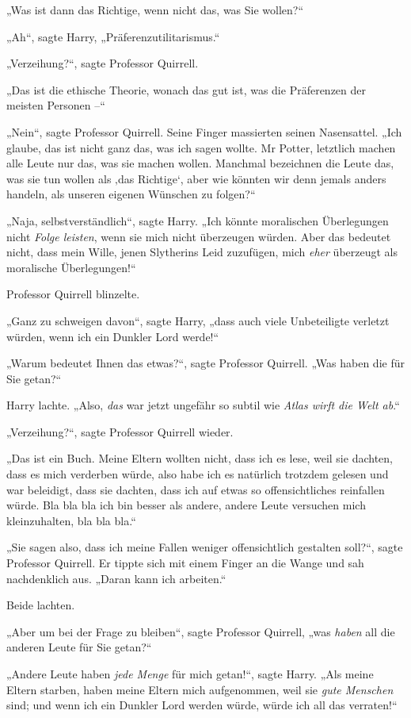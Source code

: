 {„Was ist dann das Richtige, wenn nicht das, was Sie wollen?“

„Ah“, sagte Harry, „Präferenzutilitarismus.“

„Verzeihung?“, sagte Professor Quirrell.

„Das ist die ethische Theorie, wonach das gut ist, was die Präferenzen der meisten Personen --“

„Nein“, sagte Professor Quirrell. Seine Finger massierten seinen Nasensattel. „Ich glaube, das ist nicht ganz das, was ich sagen wollte. Mr Potter, letztlich machen alle Leute nur das, was sie machen wollen. Manchmal bezeichnen die Leute das, was sie tun wollen als ‚das Richtige`, aber wie könnten wir denn jemals anders handeln, als unseren eigenen Wünschen zu folgen?“

„Naja, selbstverständlich“, sagte Harry. „Ich könnte moralischen Überlegungen nicht \emph{Folge leisten}, wenn sie mich nicht überzeugen würden. Aber das bedeutet nicht, dass mein Wille, jenen Slytherins Leid zuzufügen, mich \emph{eher} überzeugt als moralische Überlegungen!“

Professor Quirrell blinzelte.

„Ganz zu schweigen davon“, sagte Harry, „dass auch viele Unbeteiligte verletzt würden, wenn ich ein Dunkler Lord werde!“

„Warum bedeutet Ihnen das etwas?“, sagte Professor Quirrell. „Was haben die für Sie getan?“

Harry lachte. „Also, \emph{das} war jetzt ungefähr so subtil wie \emph{Atlas wirft die Welt ab}.“

„Verzeihung?“, sagte Professor Quirrell wieder.

„Das ist ein Buch. Meine Eltern wollten nicht, dass ich es lese, weil sie dachten, dass es mich verderben würde, also habe ich es natürlich trotzdem gelesen und war beleidigt, dass sie dachten, dass ich auf etwas so offensichtliches reinfallen würde. Bla bla bla ich bin besser als andere, andere Leute versuchen mich kleinzuhalten, bla bla bla.“

„Sie sagen also, dass ich meine Fallen weniger offensichtlich gestalten soll?“, sagte Professor Quirrell. Er tippte sich mit einem Finger an die Wange und sah nachdenklich aus. „Daran kann ich arbeiten.“

Beide lachten.

„Aber um bei der Frage zu bleiben“, sagte Professor Quirrell, „was \emph{haben} all die anderen Leute für Sie getan?“

„Andere Leute haben \emph{jede Menge} für mich getan!“, sagte Harry. „Als meine Eltern starben, haben meine Eltern mich aufgenommen, weil sie \emph{gute Menschen} sind; und wenn ich ein Dunkler Lord werden würde, würde ich all das verraten!“

}
